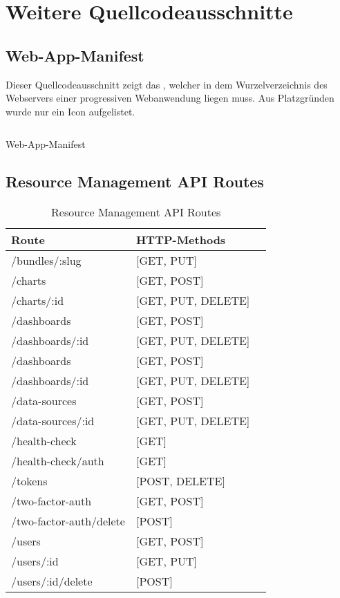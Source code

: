 \chapter{Weitere Quellcodeausschnitte}
\label{chap:weiterequellcodeausschnitte}

\section*{Web-App-Manifest}
\label{sec:webappmanifest}
Dieser Quellcodeausschnitt zeigt das , welcher in dem Wurzelverzeichnis
des Webservers einer progressiven Webanwendung liegen muss. Aus Platzgründen wurde nur ein
Icon aufgelistet.
\begin{listing}[h]
    \inputminted{jsx}{snippets/json/manifest.json}
    \caption{Web-App-Manifest}
    \label{lst:webappmanifest}
\end{listing}

\newpage

\section*{Resource Management API Routes}
\label{sec:resourcemanagementapiroutes}

\begin{table}[h]
\begin{center}
\begin{tabular}{llc}
Route & HTTP-Methods \\
\hline
/bundles/:slug          &  [GET, PUT]         \\
/charts                 &  [GET, POST]        \\
/charts/:id             &  [GET, PUT, DELETE] \\
/dashboards             &  [GET, POST]        \\
/dashboards/:id         &  [GET, PUT, DELETE] \\
/dashboards             &  [GET, POST]        \\
/dashboards/:id         &  [GET, PUT, DELETE] \\
/data-sources           &  [GET, POST]        \\
/data-sources/:id       &  [GET, PUT, DELETE] \\
/health-check           &  [GET]              \\
/health-check/auth      &  [GET]              \\
/tokens                 &  [POST, DELETE]     \\
/two-factor-auth        &  [GET, POST]        \\
/two-factor-auth/delete &  [POST]             \\
/users                  &  [GET, POST]        \\
/users/:id              &  [GET, PUT]         \\
/users/:id/delete       &  [POST]             \\
\end{tabular}
\end{center}
\caption{Resource Management API Routes}
\label{tab:unterstutzterpwafunktionsumfangteil1}
\end{table}

